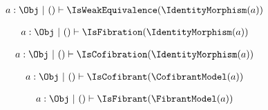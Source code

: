 

\begin{sequent}
\begin{align*}
a: \Obj ~|~ () \vdash \IsWeakEquivalence( \IdentityMorphism( a ) ) 
\end{align*}
\end{sequent}

\begin{sequent}
\begin{align*}
a: \Obj ~|~ () \vdash \IsFibration( \IdentityMorphism( a ) ) 
\end{align*}
\end{sequent}

\begin{sequent}
\begin{align*}
a: \Obj ~|~ () \vdash \IsCofibration( \IdentityMorphism( a ) ) 
\end{align*}
\end{sequent}

\begin{sequent}
\begin{align*}
a: \Obj ~|~ () \vdash \IsCofibrant( \CofibrantModel( a ) ) 
\end{align*}
\end{sequent}


\begin{sequent}
\begin{align*}
a: \Obj ~|~ () \vdash \IsFibrant( \FibrantModel( a ) ) 
\end{align*}
\end{sequent}

